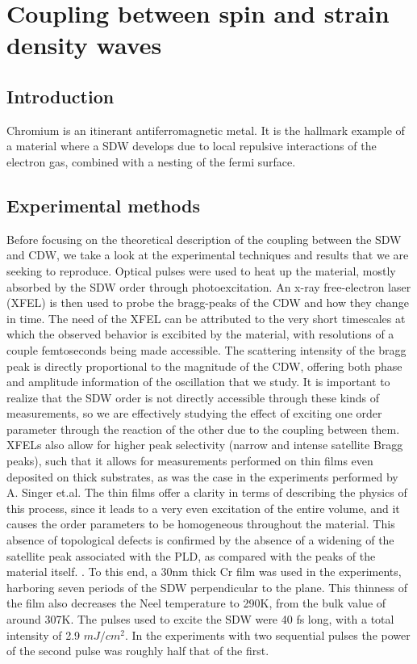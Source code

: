 \chapter{Coupling between spin and strain density waves}
\section{Introduction}
Chromium is an itinerant antiferromagnetic metal. It is the hallmark example of a material where a SDW develops due to local repulsive interactions of the electron gas, combined with a nesting of the fermi surface. 
\section{Experimental methods}
Before focusing on the theoretical description of the coupling between the SDW and CDW, we take a look at the experimental techniques and results that we are seeking to reproduce. Optical pulses were used to heat up the material, mostly absorbed by the SDW order through photoexcitation. An x-ray free-electron laser (XFEL) is then used to probe the bragg-peaks of the CDW and how they change in time. The need of the XFEL can be attributed to the very short timescales at which the observed behavior is excibited by the material, with resolutions of a couple femtoseconds being made accessible.
The scattering intensity of the bragg peak is directly proportional to the magnitude of the CDW, offering both phase and amplitude information of the oscillation that we study. It is important to realize that the SDW order is not directly accessible through these kinds of measurements, so we are effectively studying the effect of exciting one order parameter through the reaction of the other due to the coupling between them.
XFELs also allow for higher peak selectivity (narrow and intense satellite Bragg peaks), such that it allows for measurements performed on thin films even deposited on thick substrates, as was the case in the experiments performed by A. Singer et.al. The thin films offer a clarity in terms of describing the physics of this process, since it leads to a very even excitation of the entire volume, and it causes the order parameters to be homogeneous throughout the material. This absence of topological defects is confirmed by the absence of a widening of the satellite peak associated with the PLD, as compared with the peaks of the material itself. .
To this end, a 30nm thick Cr film was used in the experiments, harboring seven periods of the SDW perpendicular to the plane. This thinness of the film also decreases the Neel temperature to 290K, from the bulk value of around 307K. The pulses used to excite the SDW were 40 fs long, with a total intensity of 2.9 $mJ/cm^2$. In the experiments with two sequential pulses the power of the second pulse was roughly half that of the first.

